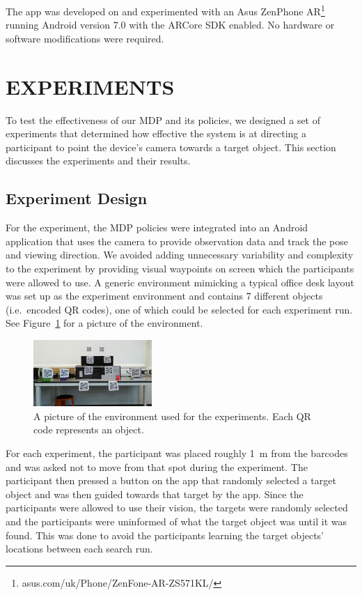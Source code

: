 \documentclass[a4paper, twoside]{article}
\begin{document}
The app was developed on and experimented with an Asus ZenPhone AR\footnote{asus.com/uk/Phone/ZenFone-AR-ZS571KL/} running Android version 7.0 with the ARCore SDK enabled. No hardware or software modifications were required.

\section{\uppercase{Experiments}}\label{sec:experiments}

\noindent To test the effectiveness of our MDP and its policies, we designed a set of experiments that determined how effective the system is at directing a participant to point the device's camera towards a target object. This section discusses the experiments and their results. 

\subsection{Experiment Design}

\noindent For the experiment, the MDP policies were integrated into an Android application that uses the camera to provide observation data and track the pose and viewing direction. We avoided adding unnecessary variability and complexity to the experiment by providing visual waypoints on screen which the participants were allowed to use. A generic environment mimicking a typical office desk layout was set up as the experiment environment and contains 7 different objects (i.e.\ encoded QR codes), one of which could be selected for each experiment run. See Figure~\ref{fig:env-picture} for a picture of the environment. 

\begin{figure}
  \centering
  \includegraphics[width=0.4\textwidth]{figures/test_env_picture.jpg}
  \caption{A picture of the environment used for the experiments. Each QR code represents an object.}\label{fig:env-picture}
\end{figure}

For each experiment, the participant was placed roughly \SI{1}{\meter} from the barcodes and was asked not to move from that spot during the experiment. The participant then pressed a button on the app that randomly selected a target object and was then guided towards that target by the app. Since the participants were allowed to use their vision, the targets were randomly selected and the participants were uninformed of what the target object was until it was found. This was done to avoid the participants learning the target objects' locations between each search run.
\end{document}
